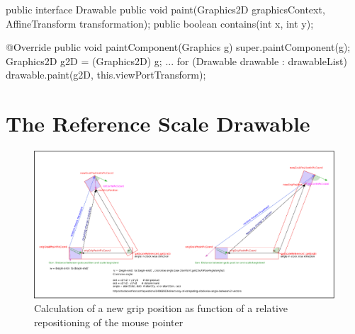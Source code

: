 \documentclass[a4paper]{book}
\begin{document}
\begin{JAVA} [label=lst:Drawable,caption=The Drawable Interface all \texttt{Drawables} are implemented against]
public interface Drawable  {	
	public void paint(Graphics2D graphicsContext, AffineTransform transformation); 		
	public boolean contains(int x, int y);	
}
\end{JAVA}


\begin{JAVA} [label=lst:TEMView_paintComponent,caption=The transformation of the viewPort (\texttt{viewPortTransform: AffineTransform}) is used by the \texttt{paint} method to place the \texttt{Drawable} objects into TEMView's graphicsContext]
	@Override
	public void paintComponent(Graphics g) {
		super.paintComponent(g);
		Graphics2D g2D = (Graphics2D) g;
		...
		for (Drawable drawable : drawableList) {
			drawable.paint(g2D, this.viewPortTransform);
		}
	}
\end{JAVA}

\section{The Reference Scale Drawable}

    

	\begin{figure}[htbp]
  		\centering
  		\includegraphics[width=\textwidth]{scaleDescription.eps}
  		\caption{Calculation of a new grip position as function of a relative repositioning of the mouse 	pointer}
	\end{figure}
\end{document}
